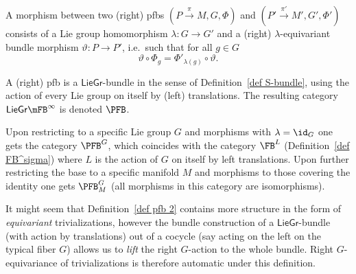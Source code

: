

\begin{defn}
    A morphism between two (right) \glspl{pfb} $(P\overset{\pi}{\to}M,G,\Phi)$ and $(P'\overset{\pi'}{\to}M',G',\Phi')$ consists of a Lie group homomorphism $\lambda:G\to G'$ and a (right) $\lambda$-equivariant bundle morphism $\vartheta:P\to P'$, i.e.\ such that for all $g\in G$
    \[\vartheta\circ \Phi_{g}=\Phi'_{\lambda(g)}\circ \vartheta.\]
\end{defn}

\begin{defn}\label{def pfb 3}
    A (right) \gls{pfb} is a $\mathsf{LieGr}$-bundle in the sense of Definition~\ref{def S-bundle}, using the action of every Lie group on itself by (left) translations. The resulting category $\mathsf{LieGr}\mFB^\infty$ is denoted $\PFB$. 
    
    Upon restricting to a specific Lie group $G$ and morphisms with $\lambda=\id_G$ one gets the category $\PFB^G$, which coincides with the category $\FB^L$ (Definition~\ref{def FB^sigma}) where $L$ is the action of $G$ on itself by left translations. Upon further restricting the base to a specific manifold $M$ and morphisms to those covering the identity one gets $\PFB^G_M$ (all morphisms in this category are isomorphisms).
\end{defn}

It might seem that Definition~\ref{def pfb 2} contains more structure in the form of \emph{equivariant} trivializations, however the bundle construction of a $\mathsf{LieGr}$-bundle (with action by translations) out of a cocycle (say acting on the left on the typical fiber $G$) allows us to \emph{lift} the right $G$-action to the whole bundle. Right $G$-equivariance of trivializations is therefore automatic under this definition.


